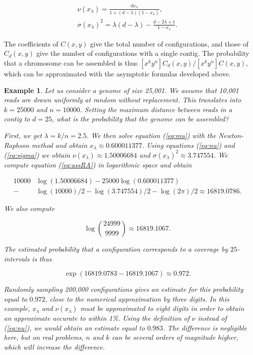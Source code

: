 \documentclass{article}
\newtheorem{example}{Example}
\begin{document}
\begin{gather}
\label{eq:nu} %
\nu(x_\lambda) = \frac{dx_\lambda}{1+(d-\lambda)(1-x_\lambda)}, \\
\label{eq:sigma} %
\sigma(x_\lambda)^2 = \lambda(d-\lambda) -
  \frac{d-2\lambda+1}{1-x_\lambda}.
\end{gather}

The coefficients of $C(x,y)$ give the total number of configurations, and
those of $C_d(x,y)$ give the number of configurations with a single
contig. The probability that a chromosome can be assembled is thus
$[x^ky^n] C_d(x,y) / [x^ky^n] C(x,y)$, which can be approximated with the
asymptotic formulas developed above.

\begin{example}
Let us consider a genome of size 25,001. We assume that 10,001 reads are
drawn uniformly at random without replacement. This translates into
$k=25000$ and $n=10000$. Setting the maximum distance between reads in a
contig to $d=25$, what is the probability that the genome can be
assembled?

First, we get $\lambda = k/n = 2.5$. We then solve equation (\ref{eq:mu})
with the Newton-Raphson method and obtain $x_\lambda \approx 0.600011377$.
Using equations (\ref{eq:nu}) and (\ref{eq:sigma}) we obtain
$\nu(x_\lambda) \approx 1.50006684$ and $\sigma(x_\lambda)^2 \approx
3.747554$. We compute equation (\ref{eq:assRA}) in logarithmic space and
obtain

\begin{equation*}
\begin{split}
10000&\log(1.50006684) - 25000\log(0.600011377) \\
- &\log(10000)/2 - \log(3.747554)/2 - \log(2\pi)/2
\approx 16819.0786.
\end{split}
\end{equation*}

We also compute 

\begin{equation*}
\log { 24999 \choose 9999 } \approx 16819.1067.
\end{equation*}

The estimated probability that a configuration corresponds to a coverage
by $25$-intervals is thus

\begin{equation*}
\exp(16819.0783-16819.1067) \approx 0.972.
\end{equation*}

Randomly sampling 200,000 configurations gives an estimate for this
probability equal to $0.972$, close to the numerical approximation by
three digits. In this example, $x_\lambda$ and $\nu(x_\lambda)$ must be
approximated to eight digits in order to obtain an approximate accurate to
within 1\%. Using the definition of $\nu$ instead of (\ref{eq:nu}), we
would obtain an estimate equal to $0.983$. The difference is negligible
here, but on real problems, $n$ and $k$ can be several orders of magnitude
higher, which will increase the difference.
\end{example}
\end{document}
